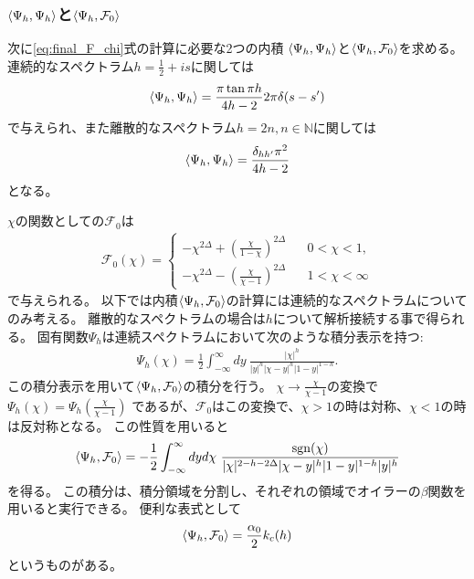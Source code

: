 \subsubsection{$\langle \Psi_h, \Psi_h \rangle$と$\langle \Psi_h, \mathcal{F}_0 \rangle$}

次に\eqref{eq:final_F_chi}式の計算に必要な2つの内積
$\langle \Psi_h, \Psi_h \rangle$と$\langle \Psi_h, \mathcal{F}_0 \rangle$を求める。
連続的なスペクトラム$h = \frac{1}{2} + is$に関しては
\begin{align}
	\langle \Psi_h, \Psi_h \rangle = \frac{\pi\tan\pi h}{4h-2}2\pi\delta(s - s')
\end{align}
で与えられ、また離散的なスペクトラム$h = 2n, n\in\mathbb{N}$に関しては
\begin{align}
	\langle \Psi_h, \Psi_h \rangle = \frac{\delta_{hh'}\pi^2}{4h-2}
\end{align}
となる。

$\chi$の関数としての$\mathcal{F}_0$は
\begin{align}
	\mathcal{F}_0(\chi) = \left\{
	\begin{array}{l}
		-\chi^{2\Delta} + \left(\frac{\chi}{1 - \chi}\right)^{2\Delta}
		\hspace{20pt}0 < \chi < 1,\\
		-\chi^{2\Delta} - \left(\frac{\chi}{\chi - 1}\right)^{2\Delta}
		\hspace{20pt}1 < \chi < \infty
	\end{array}\right.
\end{align}
で与えられる。
以下では内積$\langle \Psi_h, \mathcal{F}_0 \rangle$の計算には連続的なスペクトラムについてのみ考える。
離散的なスペクトラムの場合は$h$について解析接続する事で得られる。
固有関数$\Psi_h$は連続スペクトラムにおいて次のような積分表示を持つ:
\begin{align}
	\Psi_h(\chi) = \frac{1}{2}\int_{-\infty}^{\infty}dy\ 
	\frac{|\chi|^h}{|y|^h|\chi - y|^h|1 - y|^{1-h}}.
\end{align}
この積分表示を用いて$\langle \Psi_h, \mathcal{F}_0 \rangle$の積分を行う。
$\chi\to\frac{\chi}{\chi-1}$の変換で$\Psi_h(\chi) = \Psi_h\left(\frac{\chi}{\chi-1}\right)$
であるが、$\mathcal{F}_0$はこの変換で、$\chi > 1$の時は対称、$\chi < 1$の時は反対称となる。
この性質を用いると
\begin{align}
	\innerprod{\Psi_h}{\mathcal{F}_0}
	= -\frac{1}{2}\int_{-\infty}^{\infty}dyd\chi\ 
	\frac{\sgn(\chi)}{|\chi|^{2-h-2\Delta}|\chi-y|^h|1-y|^{1-h}|y|^h}
\end{align}
を得る。
この積分は、積分領域を分割し、それぞれの領域でオイラーの$\beta$関数を用いると実行できる。
便利な表式として
\begin{align}
	\langle \Psi_h, \mathcal{F}_0 \rangle = \frac{\alpha_0}{2}k_c(h)
\end{align}
というものがある。

